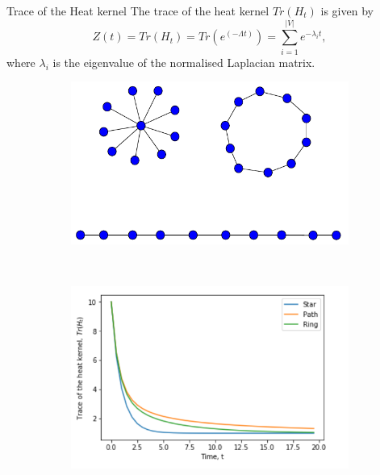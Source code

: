 \documentclass{beamer}
\begin{document}
\begin{frame}{Trace of the Heat kernel}
	The trace of the heat kernel $Tr(H_t)$ is given by
		\begin{equation}
	Z(t) = Tr(H_t) = Tr(e^{(-\Lambda t)}) = \sum_{i=1}^{|V|} e^{-\lambda_i t},
	\label{kerneltrace}
	\end{equation}
	where $\lambda_i$ is the eigenvalue of the normalised Laplacian matrix.
	
	\begin{figure}[H]
		\centering
		\begin{subfigure}[b]{0.45\textwidth}
			\includegraphics[width= \textwidth]{images/kernel-graphs.pdf}
			\caption{}
			\label{kernelgraphs}
		\end{subfigure}~
		\begin{subfigure}[b]{0.45\textwidth}
			\includegraphics[width= \textwidth]{images/Trace-kernel-plot}
			\caption{}
			\label{plot-kernel}
		\end{subfigure}
	\end{figure}
\end{frame}
\end{document}
